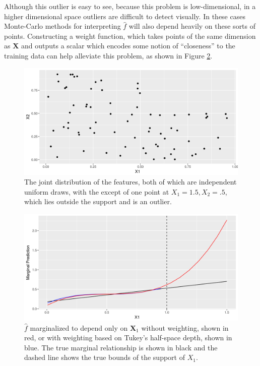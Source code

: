 Although this outlier is easy to see, because this problem is low-dimensional, in a higher dimensional space outliers are difficult to detect visually. In these cases Monte-Carlo methods for interpreting $\hat{f}$ will also depend heavily on these sorts of points. Constructing a weight function, which takes points of the same dimension as $\mathbf{X}$ and outputs a scalar which encodes some notion of ``closeness'' to the training data can help alleviate this problem, as shown in Figure \ref{figure:mp_w}. 


\begin{figure}
  \includegraphics[width=\textwidth]{mp_w_data.png}
  \caption{The joint distribution of the features, both of which are independent uniform draws, with the except of one point at $X_1 = 1.5, X_2 = .5$, which lies outside the support and is an outlier.\label{figure:mp_w_data}}
\end{figure}

\begin{figure}
  \includegraphics[width=\textwidth]{mp_w.png}
  \caption{$\hat{f}$ marginalized to depend only on $\mathbf{X}_1$ without weighting, shown in red, or with weighting based on Tukey's half-space depth, shown in blue. The true marginal relationship is shown in black and the dashed line shows the true bounds of the support of $X_1$. \label{figure:mp_w}}
\end{figure}

